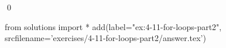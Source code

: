 
\begin{ex}
  \label{ex:4-11-for-loops-part2}
  
  \qed
\end{ex}
\begin{python0}
from solutions import *
add(label="ex:4-11-for-loops-part2",
    srcfilename='exercises/4-11-for-loops-part2/answer.tex')
\end{python0}
